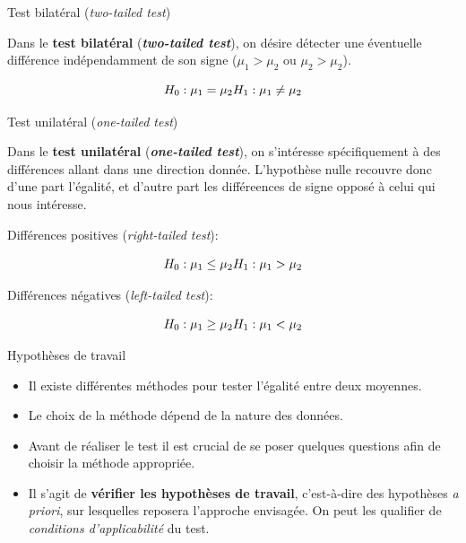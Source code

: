 \documentclass[ignorenonframetext,]{beamer}
\begin{document}
\begin{frame}{Test bilatéral (\emph{two-tailed test})}
\protect\hypertarget{test-bilatuxe9ral-two-tailed-test}{}

Dans le \textbf{test bilatéral} (\textbf{\emph{two-tailed test}}), on
désire détecter une éventuelle différence indépendamment de son signe
(\(\mu_1 > \mu_2\) ou \(\mu_2 > \mu_2\)).

\[H_0: \mu_1 = \mu_2 \\
H_1: \mu_1 \neq \mu_2\]

\end{frame}

\begin{frame}{Test unilatéral (\emph{one-tailed test})}
\protect\hypertarget{test-unilatuxe9ral-one-tailed-test}{}

Dans le \textbf{test unilatéral} (\textbf{\emph{one-tailed test}}), on
s'intéresse spécifiquement à des différences allant dans une direction
donnée. L'hypothèse nulle recouvre donc d'une part l'égalité, et d'autre
part les différeences de signe opposé à celui qui nous intéresse.

Différences positives (\emph{right-tailed test}):

\[H_0: \mu_1 \le \mu_2 \\
H_1: \mu_1 > \mu_2\]

Différences négatives (\emph{left-tailed test}):

\[H_0: \mu_1 \ge \mu_2 \\
H_1: \mu_1 < \mu_2\]

\end{frame}

\begin{frame}{Hypothèses de travail}
\protect\hypertarget{hypothuxe8ses-de-travail}{}

\begin{itemize}
\item
  Il existe différentes méthodes pour tester l'égalité entre deux
  moyennes.
\item
  Le choix de la méthode dépend de la nature des données.
\item
  Avant de réaliser le test il est crucial de se poser quelques
  questions afin de choisir la méthode appropriée.
\item
  Il s'agit de \textbf{vérifier les hypothèses de travail}, c'est-à-dire
  des hypothèses \emph{a priori}, sur lesquelles reposera l'approche
  envisagée. On peut les qualifier de \emph{conditions d'applicabilité}
  du test.
\end{itemize}

\end{frame}
\end{document}
